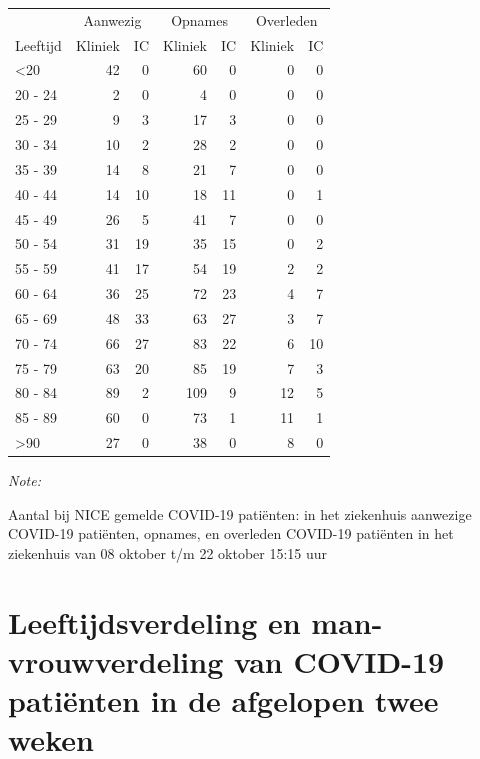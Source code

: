 \documentclass[
  english,
  man,floatsintext]{apa6}
\begin{document}
\begin{table}
\centering\begingroup\fontsize{10}{12}\selectfont

\begin{threeparttable}
\begin{tabular}{lrrrrrr}
\toprule
\multicolumn{1}{c}{ } & \multicolumn{2}{c}{Aanwezig} & \multicolumn{2}{c}{Opnames} & \multicolumn{2}{c}{Overleden} \\
\cmidrule(l{3pt}r{3pt}){2-3} \cmidrule(l{3pt}r{3pt}){4-5} \cmidrule(l{3pt}r{3pt}){6-7}
Leeftijd & Kliniek & IC & Kliniek & IC & Kliniek & IC\\
\midrule
<20 & 42 & 0 & 60 & 0 & 0 & 0\\
20 - 24 & 2 & 0 & 4 & 0 & 0 & 0\\
25 - 29 & 9 & 3 & 17 & 3 & 0 & 0\\
30 - 34 & 10 & 2 & 28 & 2 & 0 & 0\\
35 - 39 & 14 & 8 & 21 & 7 & 0 & 0\\
40 - 44 & 14 & 10 & 18 & 11 & 0 & 1\\
45 - 49 & 26 & 5 & 41 & 7 & 0 & 0\\
50 - 54 & 31 & 19 & 35 & 15 & 0 & 2\\
55 - 59 & 41 & 17 & 54 & 19 & 2 & 2\\
60 - 64 & 36 & 25 & 72 & 23 & 4 & 7\\
65 - 69 & 48 & 33 & 63 & 27 & 3 & 7\\
70 - 74 & 66 & 27 & 83 & 22 & 6 & 10\\
75 - 79 & 63 & 20 & 85 & 19 & 7 & 3\\
80 - 84 & 89 & 2 & 109 & 9 & 12 & 5\\
85 - 89 & 60 & 0 & 73 & 1 & 11 & 1\\
>90 & 27 & 0 & 38 & 0 & 8 & 0\\
\bottomrule
\end{tabular}
\begin{tablenotes}
\item \textit{Note: } 
\item Aantal bij NICE gemelde COVID-19 patiënten: in het ziekenhuis aanwezige COVID-19 patiënten, opnames, en overleden COVID-19 patiënten in het ziekenhuis van 08 oktober t/m 22 oktober 15:15 uur
\end{tablenotes}
\end{threeparttable}
\endgroup{}
\end{table}

\newpage

\hypertarget{leeftijdsverdeling-en-man-vrouwverdeling-van-covid-19-patiuxebnten-in-de-afgelopen-twee-weken}{%
\section{Leeftijdsverdeling en man-vrouwverdeling van COVID-19 patiënten in de afgelopen twee weken}\label{leeftijdsverdeling-en-man-vrouwverdeling-van-covid-19-patiuxebnten-in-de-afgelopen-twee-weken}}
\end{document}
